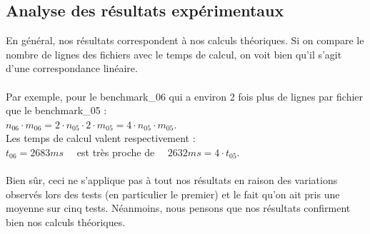 \documentclass[a4paper, 10pt, french]{article}
\begin{document}
\subsection{Analyse des résultats expérimentaux}
En général, nos résultats correspondent à nos calculs théoriques. Si on compare le nombre de lignes des fichiers avec le temps de calcul,
on voit bien qu'il s'agit d'une correspondance linéaire.
\\
\\
Par exemple, pour le benchmark\_06 qui a environ 2 fois plus de lignes par fichier que le benchmark\_05 :\\ 
$n_{06} \cdot m_{06} = 2 \cdot n_{05} \cdot 2 \cdot m_{05} = 4 \cdot n_{05} \cdot m_{05}$.\\
Les temps de calcul valent respectivement :\\ 
$t_{06} = 2683 ms \quad$ est très proche de $\quad 2632 ms = 4 \cdot t_{05}$.\\
\\
Bien sûr,  ceci ne s'applique pas à tout nos résultats en raison des variations observés lors des tests (en particulier le premier) et le fait qu’on ait pris une moyenne sur cinq tests. Néanmoins, nous pensons que nos résultats confirment bien nos calculs théoriques.
\\
\newpage
\end{document}
